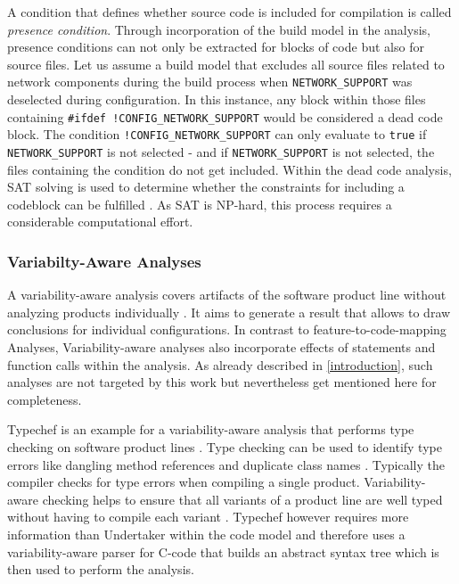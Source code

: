 \documentclass[a4paper]{article}
\begin{document}
A condition that defines whether source code is included for compilation is called \emph{presence condition}. Through incorporation of the build model in the analysis, presence conditions can not only be extracted for blocks of code but also for source files. Let us assume a build model that excludes all source files related to network components during the build process when \texttt{NETWORK\_SUPPORT} was deselected during configuration. In this instance, any block within those files containing \texttt{\#ifdef !CONFIG\_NETWORK\_SUPPORT} would be considered a dead code block. The condition \texttt{!CONFIG\_NETWORK\_SUPPORT} can only evaluate to \texttt{true} if \texttt{NETWORK\_SUPPORT} is not selected - and if \texttt{NETWORK\_SUPPORT} is not selected, the files containing the condition do not get included. Within the dead code analysis, SAT solving is used to determine whether the constraints for including a codeblock can be fulfilled \cite{Tartler:2011:FCC:1966445.1966451}. As SAT is NP-hard, this process requires a considerable computational effort.

\subsubsection{Variabilty-Aware Analyses}

A variability-aware analysis covers artifacts of the software product line without analyzing products individually \cite[p.261]{Apel:2013:FSP:2541773}. It aims to generate a result that allows to draw conclusions for individual configurations. In contrast to feature-to-code-mapping Analyses, Variability-aware analyses also incorporate effects of statements and function calls within the analysis. As already described in \autoref{introduction}, such analyses are not targeted by this work but nevertheless get mentioned here for completeness.

Typechef is an example for a variability-aware analysis that performs type checking on software product lines \cite{Dietrich:2012:RAV:2362536.2362544}. Type checking can be used to identify type errors like dangling method references and duplicate class names \cite{Thum:2014:CSA:2620784.2580950}. Typically the compiler checks for type errors when compiling a single product.  Variability-aware  checking helps to ensure that all variants of a product line are well typed without having to compile each variant \cite{Kenner:2010:TTT:1868688.1868693}. Typechef however requires more information than Undertaker within the code model and therefore uses a variability-aware parser for C-code that builds an abstract syntax tree which is then used to perform the analysis.
\end{document}
